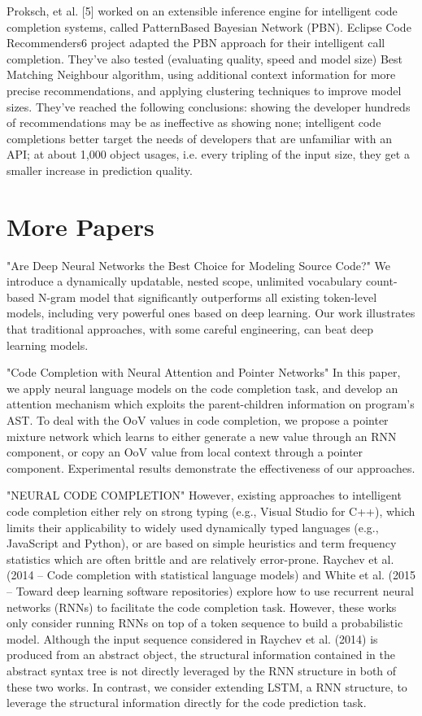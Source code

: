 Proksch, et al. [5] worked on an extensible inference engine for intelligent code completion
systems, called PatternBased Bayesian Network (PBN). Eclipse Code Recommenders6 project adapted
the PBN approach for their intelligent call completion. They've also tested (evaluating quality,
speed and model size) Best Matching Neighbour algorithm, using additional context information
for more precise recommendations, and applying clustering techniques to improve model sizes.
They've reached the following conclusions: showing the developer hundreds of recommendations
may be as ineffective as showing none; intelligent code completions better target the needs of
developers that are unfamiliar with an API; at about 1,000 object usages, i.e. every tripling
of the input size, they get a smaller increase in prediction quality.

\section{More Papers}
"Are Deep Neural Networks the Best Choice for Modeling Source Code?"
We introduce a dynamically updatable, nested scope, unlimited vocabulary count-based
N-gram model that significantly outperforms all existing token-level models, including
very powerful ones based on deep learning. Our work illustrates that traditional
approaches, with some careful engineering, can beat deep learning models.

"Code Completion with Neural Attention and Pointer Networks"
In this paper, we apply neural language models on the code completion task, and
develop an attention mechanism which exploits the parent-children information on
program’s AST. To deal with the OoV values in code completion, we propose a pointer
mixture network which learns to either generate a new value through an RNN component,
or copy an OoV value from local context through a pointer component. Experimental
results demonstrate the effectiveness of our approaches.

"NEURAL CODE COMPLETION"
However, existing approaches to intelligent code completion either rely on strong typing
(e.g., Visual Studio for C++), which limits their applicability to widely used dynamically
typed languages (e.g., JavaScript and Python), or are based on simple heuristics and term
frequency statistics which are often brittle and are relatively error-prone.
Raychev et al. (2014 -- Code completion with statistical language models) and White et al.
(2015 -- Toward deep learning software repositories) explore how to use recurrent neural networks
(RNNs) to facilitate the code completion task. However, these works only consider running
RNNs on top of a token sequence to build a probabilistic model. Although the input sequence
considered in Raychev et al. (2014) is produced from an abstract object, the structural
information contained in the abstract syntax tree is not directly leveraged by the RNN structure
in both of these two works. In contrast, we consider extending LSTM, a RNN structure,
to leverage the structural information directly for the code prediction task.

